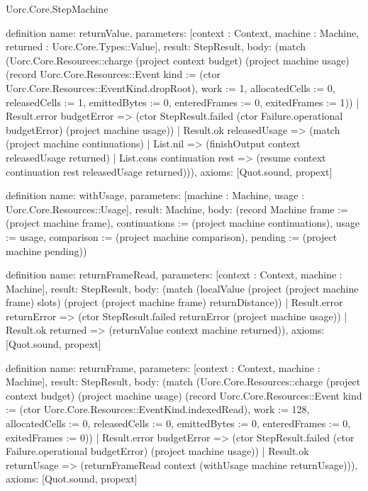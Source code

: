 \begin{lexlean}{Uorc.Core.StepMachine}
\begin{semanticmodule}
definition{
  name: returnValue,
  parameters: [context : Context, machine : Machine, returned : Uorc.Core.Types::Value],
  result: StepResult,
  body: (match (Uorc.Core.Resources::charge (project context budget) (project machine usage) (record Uorc.Core.Resources::Event {kind := (ctor Uorc.Core.Resources::EventKind.dropRoot), work := 1, allocatedCells := 0, releasedCells := 1, emittedBytes := 0, enteredFrames := 0, exitedFrames := 1}))
    | Result.error budgetError => (ctor StepResult.failed (ctor Failure.operational budgetError) (project machine usage))
    | Result.ok releasedUsage => (match (project machine continuations)
      | List.nil => (finishOutput context releasedUsage returned)
      | List.cons continuation rest => (resume context continuation rest releasedUsage returned))),
  axioms: [Quot.sound, propext]
}

definition{
  name: withUsage,
  parameters: [machine : Machine, usage : Uorc.Core.Resources::Usage],
  result: Machine,
  body: (record Machine {frame := (project machine frame), continuations := (project machine continuations), usage := usage, comparison := (project machine comparison), pending := (project machine pending)})
}

definition{
  name: returnFrameRead,
  parameters: [context : Context, machine : Machine],
  result: StepResult,
  body: (match (localValue (project (project machine frame) slots) (project (project machine frame) returnDistance))
    | Result.error returnError => (ctor StepResult.failed returnError (project machine usage))
    | Result.ok returned => (returnValue context machine returned)),
  axioms: [Quot.sound, propext]
}

definition{
  name: returnFrame,
  parameters: [context : Context, machine : Machine],
  result: StepResult,
  body: (match (Uorc.Core.Resources::charge (project context budget) (project machine usage) (record Uorc.Core.Resources::Event {kind := (ctor Uorc.Core.Resources::EventKind.indexedRead), work := 128, allocatedCells := 0, releasedCells := 0, emittedBytes := 0, enteredFrames := 0, exitedFrames := 0}))
    | Result.error budgetError => (ctor StepResult.failed (ctor Failure.operational budgetError) (project machine usage))
    | Result.ok returnUsage => (returnFrameRead context (withUsage machine returnUsage))),
  axioms: [Quot.sound, propext]
}


\end{semanticmodule}
\end{lexlean}
